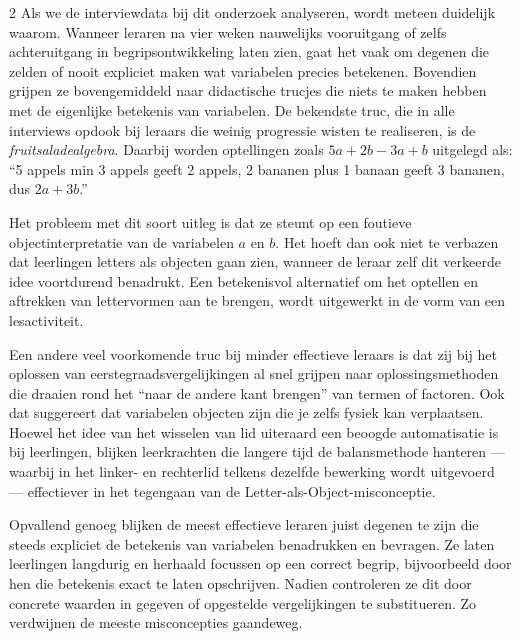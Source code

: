 \begin{multicols}{2}
Als we de interviewdata bij dit onderzoek analyseren, wordt meteen duidelijk waarom. Wanneer leraren na vier weken nauwelijks vooruitgang of zelfs achteruitgang in begripsontwikkeling laten zien, gaat het vaak om degenen die zelden of nooit expliciet maken wat variabelen precies betekenen. Bovendien grijpen ze bovengemiddeld naar didactische trucjes die niets te maken hebben met de eigenlijke betekenis van variabelen. De bekendste truc, die in alle interviews opdook bij leraars die weinig progressie wisten te realiseren, is de \textit{fruitsaladealgebra}. Daarbij worden optellingen zoals $5a+2b-3a+b$ uitgelegd als: ``5 appels min 3 appels geeft 2 appels, 2 bananen plus 1 banaan geeft 3 bananen, dus $2a+3b$.''

Het probleem met dit soort uitleg is dat ze steunt op een foutieve objectinterpretatie van de variabelen $a$ en $b$. Het hoeft dan ook niet te verbazen dat leerlingen letters als objecten gaan zien, wanneer de leraar zelf dit verkeerde idee voortdurend benadrukt. Een betekenisvol alternatief om het optellen en aftrekken van lettervormen aan te brengen, wordt uitgewerkt in de vorm van een lesactiviteit.

Een andere veel voorkomende truc bij minder effectieve leraars is dat zij bij het oplossen van eerstegraadsvergelijkingen al snel grijpen naar oplossingsmethoden die draaien rond het ``naar de andere kant brengen'' van termen of factoren. Ook dat suggereert dat variabelen objecten zijn die je zelfs fysiek kan verplaatsen. Hoewel het idee van het wisselen van lid uiteraard een beoogde automatisatie is bij leerlingen, blijken leerkrachten die langere tijd de balansmethode hanteren — waarbij in het linker- en rechterlid telkens dezelfde bewerking wordt uitgevoerd — effectiever in het tegengaan van de Letter-als-Object-misconceptie.

Opvallend genoeg blijken de meest effectieve leraren juist degenen te zijn die steeds expliciet de betekenis van variabelen benadrukken en bevragen. Ze laten leerlingen langdurig en herhaald focussen op een correct begrip, bijvoorbeeld door hen die betekenis exact te laten opschrijven. Nadien controleren ze dit door concrete waarden in gegeven of opgestelde vergelijkingen te substitueren. Zo verdwijnen de meeste misconcepties gaandeweg.\end{multicols}
